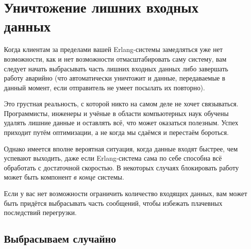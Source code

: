 \section{Уничтожение лишних входных данных}

Когда клиентам за пределами вашей Erlang-системы замедляться уже нет возможности, как и нет возможности отмасштабировать саму систему, вам следует начать выбрасывать часть лишних входных данных либо завершать работу аварийно (что автоматически уничтожит и данные, передаваемые в данный момент, если отправитель не умеет посылать их повторно).

Это грустная реальность, с которой никто на самом деле не хочет связываться. Программисты, инженеры и учёные в области компьютерных наук обучены удалять лишние данные и оставлять всё, что может оказаться полезным. Успех приходит  путём оптимизации, а не когда мы сдаёмся и перестаём бороться.

Однако имеется вполне вероятная ситуация, когда данные входят быстрее, чем успевают выходить, даже если Erlang-система сама по себе способна всё обработать с достаточной скоростью. В некоторых случаях блокировать работу может быть компонент \emph{в конце} системы.

Если у вас нет возможности ограничить количество входящих данных, вам может быть придётся выбрасывать часть сообщений, чтобы избежать плачевных последствий перегрузки.


\subsection{Выбрасываем случайно}

